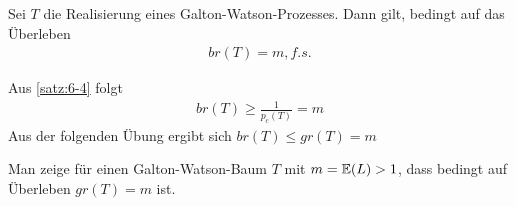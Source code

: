 %
%
%

\begin{korollar}
	Sei $T$ die Realisierung eines Galton-Watson-Prozesses. Dann gilt, bedingt auf das Überleben 
	\begin{align}
		br(T) = m, f.s.
	\end{align}
\end{korollar}
\begin{beweis}
	Aus \autoref{satz:6-4} folgt
	\begin{align}
		br(T) \geq \frac{1}{p_c(T)} = m
	\end{align}
	Aus der folgenden Übung ergibt sich $br(T) \leq gr(T) = m$
\end{beweis}
\begin{uebung}
	Man zeige für einen Galton-Watson-Baum $T$ mit $m = \EW{L} > 1$, dass bedingt auf Überleben $gr(T) = m$ ist.
\end{uebung}

